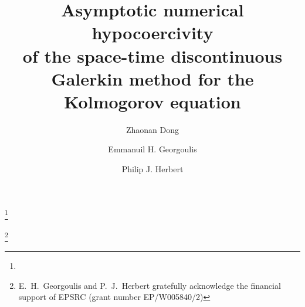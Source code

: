 \documentclass{amsart}
\theoremstyle{definition}
\theoremstyle{remark}
\numberwithin{equation}{section}
\begin{document}
\title[Asymptotic numerical hypocoercivity of space-time dG]{Asymptotic numerical hypocoercivity \\ of the space-time discontinuous Galerkin method  for  {the} Kolmogorov equation}



\author{Zhaonan Dong}
\address{(Z.~Dong)  Inria, 48 Rue Barrault, 75589, Paris, France and CERMICS, ENPC, Institut Polytechnique de Paris, CNRS,  6 \& 8 avenue B.~Pascal, 77455 Marne-la-Vall\'{e}e, France.}
\thanks{}

\author{Emmanuil H. Georgoulis}
\address{(E.~H.~Georgoulis) The Maxwell Institute for Mathematical Sciences \& Department of Mathematics, Heriot-Watt University,   Edinburgh EH14 4AS, United Kingdom, {\sc and} Department of Mathematics, School of Applied Mathematical and Physical Sciences, National Technical University of Athens, Zografou 15780, Greece, {\sc and} IACM-FORTH, Greece.}
\thanks{E.~H.~Georgoulis and P.~J.~Herbert gratefully acknowledge the financial support of EPSRC (grant number EP/W005840/2)}


\author{Philip J. Herbert}
\address{(P.~J.~Herbert) Department of Mathematics, University of Sussex, Brighton BN1 9RF, United Kingdom.}



\date{}

\dedicatory{}
\end{document}
